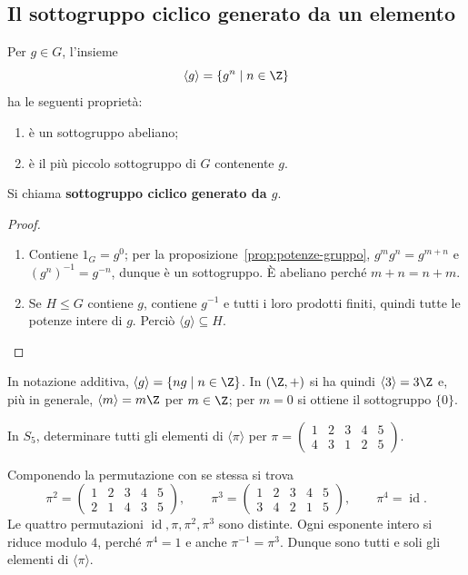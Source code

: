 \subsection{Il sottogruppo ciclico generato da un elemento}
\begin{proposizione}\label{prop:ciclico}
Per $g\in G$, l'insieme
\[
\langle g\rangle=\{g^n\mid n\in\Z\}
\]
ha le seguenti proprietà:
\begin{enumerate}[label=\arabic*.]
\item è un sottogruppo abeliano;
\item è il più piccolo sottogruppo di $G$ contenente $g$.
\end{enumerate}
Si chiama \textbf{sottogruppo ciclico generato da $g$}.
\end{proposizione}
\begin{proof}
\begin{enumerate}[label=\arabic*.]
\item Contiene $1_G=g^0$; per la proposizione~\ref{prop:potenze-gruppo}, $g^mg^n=g^{m+n}$ e $(g^n)^{-1}=g^{-n}$, dunque è un sottogruppo. È abeliano perché $m+n=n+m$.
\item Se $H\le G$ contiene $g$, contiene $g^{-1}$ e tutti i loro prodotti finiti, quindi tutte le potenze intere di $g$. Perciò $\langle g\rangle\subseteq H$.
\end{enumerate}
\end{proof}

\begin{esempio}
In notazione additiva, $\langle g\rangle=\{ng\mid n\in\Z\}$. In $(\Z,+)$ si ha quindi $\langle3\rangle=3\Z$ e, più in generale, $\langle m\rangle=m\Z$ per $m\in\Z$; per $m=0$ si ottiene il sottogruppo $\{0\}$.
\end{esempio}

\begin{esercizio}
In $S_5$, determinare tutti gli elementi di $\langle\pi\rangle$ per
$\pi=\left(\begin{smallmatrix}1&2&3&4&5\\4&3&1&2&5\end{smallmatrix}\right)$.
\end{esercizio}
\begin{svolgimento}
Componendo la permutazione con se stessa si trova
\[
\pi^2=\begin{pmatrix}1&2&3&4&5\\2&1&4&3&5\end{pmatrix},\qquad
\pi^3=\begin{pmatrix}1&2&3&4&5\\3&4&2&1&5\end{pmatrix},\qquad
\pi^4=\operatorname{id}.
\]
Le quattro permutazioni $\operatorname{id},\pi,\pi^2,\pi^3$ sono distinte. Ogni esponente intero si riduce modulo $4$, perché $\pi^4=1$ e anche $\pi^{-1}=\pi^3$. Dunque sono tutti e soli gli elementi di $\langle\pi\rangle$.
\end{svolgimento}

